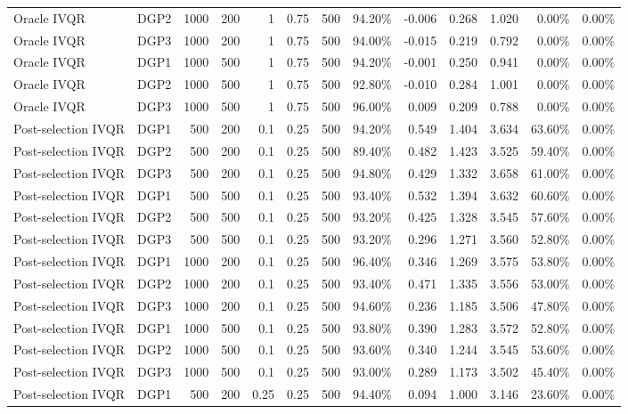 \begin{landscape}
\begin{longtable}{llrrrrrrrrrrr}
Oracle IVQR & DGP2 & 1000 & 200 & 1 & 0.75 & 500 & 94.20\% & -0.006 & 0.268 & 1.020 & 0.00\% & 0.00\% \\
Oracle IVQR & DGP3 & 1000 & 200 & 1 & 0.75 & 500 & 94.00\% & -0.015 & 0.219 & 0.792 & 0.00\% & 0.00\% \\
Oracle IVQR & DGP1 & 1000 & 500 & 1 & 0.75 & 500 & 94.20\% & -0.001 & 0.250 & 0.941 & 0.00\% & 0.00\% \\
Oracle IVQR & DGP2 & 1000 & 500 & 1 & 0.75 & 500 & 92.80\% & -0.010 & 0.284 & 1.001 & 0.00\% & 0.00\% \\
Oracle IVQR & DGP3 & 1000 & 500 & 1 & 0.75 & 500 & 96.00\% & 0.009 & 0.209 & 0.788 & 0.00\% & 0.00\% \\
Post-selection IVQR & DGP1 & 500 & 200 & 0.1 & 0.25 & 500 & 94.20\% & 0.549 & 1.404 & 3.634 & 63.60\% & 0.00\% \\
Post-selection IVQR & DGP2 & 500 & 200 & 0.1 & 0.25 & 500 & 89.40\% & 0.482 & 1.423 & 3.525 & 59.40\% & 0.00\% \\
Post-selection IVQR & DGP3 & 500 & 200 & 0.1 & 0.25 & 500 & 94.80\% & 0.429 & 1.332 & 3.658 & 61.00\% & 0.00\% \\
Post-selection IVQR & DGP1 & 500 & 500 & 0.1 & 0.25 & 500 & 93.40\% & 0.532 & 1.394 & 3.632 & 60.60\% & 0.00\% \\
Post-selection IVQR & DGP2 & 500 & 500 & 0.1 & 0.25 & 500 & 93.20\% & 0.425 & 1.328 & 3.545 & 57.60\% & 0.00\% \\
Post-selection IVQR & DGP3 & 500 & 500 & 0.1 & 0.25 & 500 & 93.20\% & 0.296 & 1.271 & 3.560 & 52.80\% & 0.00\% \\
Post-selection IVQR & DGP1 & 1000 & 200 & 0.1 & 0.25 & 500 & 96.40\% & 0.346 & 1.269 & 3.575 & 53.80\% & 0.00\% \\
Post-selection IVQR & DGP2 & 1000 & 200 & 0.1 & 0.25 & 500 & 93.40\% & 0.471 & 1.335 & 3.556 & 53.00\% & 0.00\% \\
Post-selection IVQR & DGP3 & 1000 & 200 & 0.1 & 0.25 & 500 & 94.60\% & 0.236 & 1.185 & 3.506 & 47.80\% & 0.00\% \\
Post-selection IVQR & DGP1 & 1000 & 500 & 0.1 & 0.25 & 500 & 93.80\% & 0.390 & 1.283 & 3.572 & 52.80\% & 0.00\% \\
Post-selection IVQR & DGP2 & 1000 & 500 & 0.1 & 0.25 & 500 & 93.60\% & 0.340 & 1.244 & 3.545 & 53.60\% & 0.00\% \\
Post-selection IVQR & DGP3 & 1000 & 500 & 0.1 & 0.25 & 500 & 93.00\% & 0.289 & 1.173 & 3.502 & 45.40\% & 0.00\% \\
Post-selection IVQR & DGP1 & 500 & 200 & 0.25 & 0.25 & 500 & 94.40\% & 0.094 & 1.000 & 3.146 & 23.60\% & 0.00\% \\

\end{longtable}
\end{landscape}
